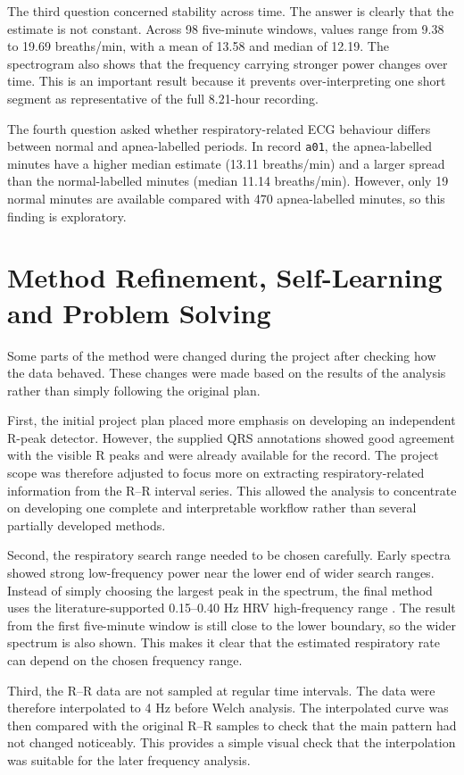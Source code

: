 \documentclass[a4paper,10.5pt,oneside]{report}
\begin{document}
The third question concerned stability across time. The answer is clearly that
the estimate is not constant. Across 98 five-minute windows, values range from
9.38 to 19.69 breaths/min, with a mean of 13.58 and median of 12.19. The
spectrogram also shows that the frequency carrying stronger power changes over
time. This is an important result because it prevents over-interpreting one
short segment as representative of the full 8.21-hour recording.

The fourth question asked whether respiratory-related ECG behaviour differs
between normal and apnea-labelled periods. In record \texttt{a01}, the
apnea-labelled minutes have a higher median estimate (13.11 breaths/min) and a
larger spread than the normal-labelled minutes (median 11.14 breaths/min).
However, only 19 normal minutes are available compared with 470 apnea-labelled
minutes, so this finding is exploratory.

\section{Method Refinement, Self-Learning and Problem Solving}

Some parts of the method were changed during the project after checking how the data behaved. These changes were made based on the results of the analysis rather than simply following the original plan.

First, the initial project plan placed more emphasis on developing an
independent R-peak detector. However, the supplied QRS annotations showed good agreement with the visible R peaks and were already available for the record. The project scope was therefore adjusted to focus more on extracting respiratory-related information from the R--R interval series. This allowed the analysis to concentrate on developing one complete and interpretable workflow rather than several partially developed methods.

Second, the respiratory search range needed to be chosen carefully. Early spectra showed strong low-frequency power near the lower end of wider search ranges. Instead of simply choosing the largest peak in the spectrum, the final method uses the literature-supported 0.15--0.40 Hz HRV high-frequency range \citep{taskforce1996}. The result from the first five-minute window is still close to the lower boundary, so the wider spectrum is also shown. This makes it clear that the estimated respiratory rate can depend on the chosen frequency range.

Third, the R--R data are not sampled at regular time intervals. The data were therefore interpolated to 4 Hz before Welch analysis. The interpolated curve was then compared with the original R--R samples to check that the main pattern had not changed noticeably. This provides a simple visual check that the interpolation was suitable for the later frequency analysis.
\end{document}
